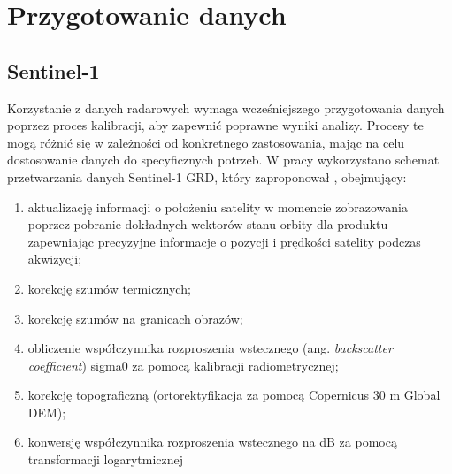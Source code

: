 \documentclass{amuthesis}
\begin{document}
\hypertarget{sec-processing}{%
\section{Przygotowanie danych}\label{sec-processing}}

\hypertarget{sec-processing-s1}{%
\subsection{Sentinel-1}\label{sec-processing-s1}}

Korzystanie z danych radarowych wymaga wcześniejszego przygotowania
danych poprzez proces kalibracji, aby zapewnić poprawne wyniki analizy.
Procesy te mogą różnić się w zależności od konkretnego zastosowania,
mając na celu dostosowanie danych do specyficznych potrzeb. W pracy
wykorzystano schemat przetwarzania danych Sentinel-1 GRD, który
zaproponował \textcite{filipponi_2019_s1_workflow}, obejmujący:

\begin{enumerate}
\def\labelenumi{\arabic{enumi}.}
\item
  aktualizację informacji o położeniu satelity w momencie zobrazowania
  poprzez pobranie dokładnych wektorów stanu orbity dla produktu
  zapewniając precyzyjne informacje o pozycji i prędkości satelity
  podczas akwizycji;
\item
  korekcję szumów termicznych;
\item
  korekcję szumów na granicach obrazów;
\item
  obliczenie współczynnika rozproszenia wstecznego (ang.
  \emph{backscatter coefficient}) sigma0 za pomocą kalibracji
  radiometrycznej;
\item
  korekcję topograficzną (ortorektyfikacja za pomocą Copernicus 30 m
  Global DEM);
\item
  konwersję współczynnika rozproszenia wstecznego na dB za pomocą
  transformacji logarytmicznej
\end{enumerate}
\end{document}

